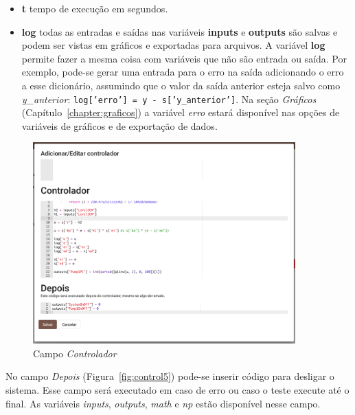 \begin{itemize}
    \item \textbf{t} tempo de execução em segundos.
    \item \textbf{log} todas as entradas e saídas nas variáveis \textbf{inputs}
                       e \textbf{outputs} são salvas e podem ser vistas em
                       gráficos e exportadas para arquivos. A variável
                       \textbf{log} permite fazer a mesma coisa com variáveis
                       que não são entrada ou saída. Por exemplo, pode-se gerar
                       uma entrada para o erro na saída adicionando o erro a
                       esse dicionário, assumindo que o valor da saída anterior
                       esteja salvo como \textit{y\_anterior}:
                       \texttt{log['erro'] = y - s['y_anterior']}.
                       Na seção \textit{Gráficos}
                       (Capítulo~\ref{chapter:graficos}) a variável
                       \textit{erro} estará disponível nas opções de variáveis
                       de gráficos e de exportação de dados.
\end{itemize}

\begin{figure}[ht!]
    \centering
    \includegraphics[width=0.9\textwidth]{imgs/control4}
    \caption[Campo \textit{Controlador}]{Campo \textit{Controlador}}%
    \label{fig:control4}
\end{figure}

No campo \textit{Depois} (Figura~\ref{fig:control5}) pode-se inserir código para
desligar o sistema. Esse campo será executado em caso de erro ou caso o teste
execute até o final. As variáveis \textit{inputs}, \textit{outputs},
\textit{math} e \textit{np} estão disponível nesse campo.

